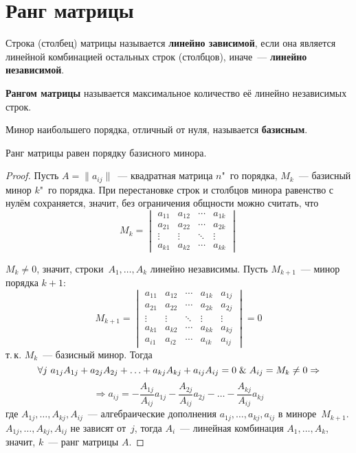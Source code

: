 \section{Ранг матрицы}
Строка (столбец) матрицы называется \textbf{линейно зависимой}, если она является линейной комбинацией остальных строк (столбцов), иначе~--- \textbf{линейно независимой}.

 \textbf{Рангом матрицы} называется максимальное количество её линейно независимых строк.

 Минор наибольшего порядка, отличный от нуля, называется \textbf{базисным}.

\begin{theorem}
Ранг матрицы равен порядку базисного минора.
\end{theorem}
\begin{proof}
Пусть $A = \|a_{ij}\|$~--- квадратная матрица $n$"~го порядка, $M_k$~--- базисный минор $k$"~го порядка.
При перестановке строк и столбцов минора равенство с нулём сохраняется, значит, без ограничения общности можно считать, что
\begin{equation*}
M_k =
\begin{vmatrix}
a_{11} & a_{12} & \cdots & a_{1k} \\
a_{21} & a_{22} & \cdots & a_{2k} \\
\vdots & \vdots & \ddots & \vdots \\
a_{k1} & a_{k2} & \cdots & a_{kk}
\end{vmatrix}
\end{equation*}

$M_k \neq 0$, значит, строки~$A_1, \ldots, A_k$ линейно независимы. Пусть $M_{k+1}$~--- минор порядка $k + 1$:
\begin{equation*}
M_{k+1} =
\begin{vmatrix}
a_{11} & a_{12} & \cdots & a_{1k} & a_{1j} \\
a_{21} & a_{22} & \cdots & a_{2k} & a_{2j} \\
\vdots & \vdots & \ddots & \vdots & \vdots \\
a_{k1} & a_{k2} & \cdots & a_{kk} & a_{kj} \\
a_{i1} & a_{i2} & \cdots & a_{ik} & a_{ij}
\end{vmatrix} = 0
\end{equation*}
т.\,к. $M_k$~--- базисный минор.
Тогда
\begin{equation*}
\forall j \ a_{1j} A_{1j} + a_{2j} A_{2j} + \ldots + a_{kj} A_{kj} + a_{ij} A_{ij} = 0 \mathrel{\&} A_{ij} = M_k \neq 0 \Rightarrow
\end{equation*}
\begin{equation*}
\Rightarrow a_{ij} = -\frac{A_{1j}}{A_{ij}} a_{1j} - \frac{A_{2j}}{A_{ij}} a_{2j} - \ldots - \frac{A_{kj}}{A_{ij}} a_{kj}
\end{equation*}
где $A_{1j}, \ldots, A_{kj}, A_{ij}$~--- алгебраические дополнения $a_{1j}, \ldots, a_{kj}, a_{ij}$ в миноре~$M_{k+1}$.
$A_{1j}, \ldots, A_{kj}, A_{ij}$ не зависят от~$j$, тогда $A_i$~--- линейная комбинация $A_1, \ldots, A_k$, значит, $k$~--- ранг матрицы $A$.
\end{proof}


